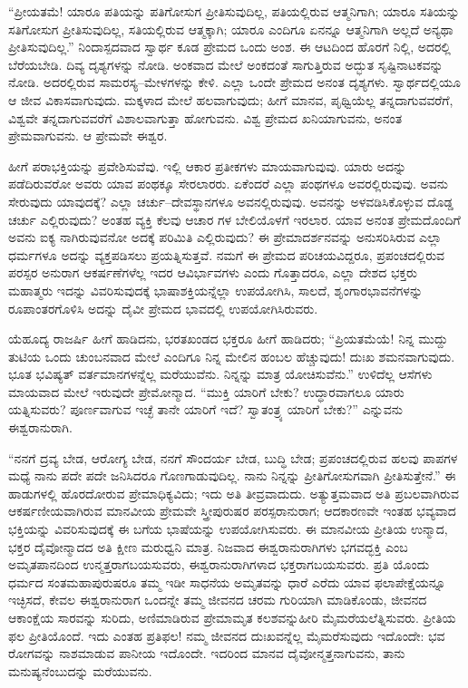 “ಪ್ರೀಯತಮೆ! ಯಾರೂ ಪತಿಯನ್ನು ಪತಿಗೋಸುಗ ಪ್ರೀತಿಸುವುದಿಲ್ಲ, ಪತಿಯಲ್ಲಿರುವ ಆತ್ಮನಿಗಾಗಿ; ಯಾರೂ ಸತಿಯನ್ನು ಸತಿಗೋಸುಗ ಪ್ರೀತಿಸುವುದಿಲ್ಲ, ಸತಿಯಲ್ಲಿರುವ ಆತ್ಮಕ್ಕಾಗಿ; ಯಾರೂ ಎಂದಿಗೂ ಏನನ್ನೂ ಆತ್ಮನಿಗಾಗಿ ಅಲ್ಲದೆ ಅನ್ಯಥಾ ಪ್ರೀತಿಸುವುದಿಲ್ಲ.” ನಿಂದಾಸ್ಪದವಾದ ಸ್ವಾರ್ಥ ಕೂಡ ಪ್ರೇಮದ ಒಂದು ಅಂಶ. ಈ ಆಟದಿಂದ ಹೊರಗೆ ನಿಲ್ಲಿ, ಅದರಲ್ಲಿ ಬೆರೆಯಬೇಡಿ. ದಿವ್ಯ ದೃಶ್ಯಗಳನ್ನು ನೋಡಿ. ಅಂಕವಾದ ಮೇಲೆ ಅಂಕದಂತೆ ಸಾಗುತ್ತಿರುವ ಅದ್ಭುತ ಸೃಷ್ಟಿನಾಟಕವನ್ನು ನೋಡಿ. ಅದರಲ್ಲಿರುವ ಸಾಮರಸ್ಯ–ಮೇಳಗಳನ್ನು ಕೇಳಿ. ಎಲ್ಲಾ ಒಂದೇ ಪ್ರೇಮದ ಅನಂತ ದೃಶ್ಯಗಳು. ಸ್ವಾರ್ಥದಲ್ಲಿಯೂ ಆ ಜೀವ ವಿಕಾಸವಾಗುವುದು. ಮಕ್ಕಳಾದ ಮೇಲೆ ಹಲವಾಗುವುದು; ಹೀಗೆ ಮಾನವ, ಪೃಥ್ವಿಯೆಲ್ಲ ತನ್ನದಾಗುವವರೆಗೆ, ವಿಶ್ವವೇ ತನ್ನದಾಗುವವರೆಗೆ ವಿಶಾಲವಾಗುತ್ತಾ ಹೋಗುವನು. ವಿಶ್ವ ಪ್ರೇಮದ ಖನಿಯಾಗುವನು, ಅನಂತ ಪ್ರೇಮವಾಗುವನು. ಆ ಪ್ರೇಮವೇ ಈಶ್ವರ.

ಹೀಗೆ ಪರಾಭಕ್ತಿಯನ್ನು ಪ್ರವೇಶಿಸುವೆವು. ಇಲ್ಲಿ ಆಕಾರ ಪ್ರತೀಕಗಳು ಮಾಯವಾಗುವುವು. ಯಾರು ಅದನ್ನು ಪಡೆದಿರುವರೋ ಅವರು ಯಾವ ಪಂಥಕ್ಕೂ ಸೇರಲಾರರು. ಏಕೆಂದರೆ ಎಲ್ಲಾ ಪಂಥಗಳೂ ಅವರಲ್ಲಿರುವುವು. ಅವನು ಸೇರುವುದು ಯಾವುದಕ್ಕೆ? ಎಲ್ಲಾ ಚರ್ಚು–ದೇವಸ್ಥಾನಗಳೂ ಅವನಲ್ಲಿರುವುವು. ಅವನನ್ನು ಅಳವಡಿಸಿಕೊಳ್ಳುವ ದೊಡ್ಡ ಚರ್ಚು ಎಲ್ಲಿರುವುದು? ಅಂತಹ ವ್ಯಕ್ತಿ ಕೆಲವು ಆಚಾರ ಗಳ ಬೇಲಿಯೊಳಗೆ ಇರಲಾರ. ಯಾವ ಅನಂತ ಪ್ರೇಮದೊಂದಿಗೆ ಅವನು ಐಕ್ಯ ನಾಗಿರುವುವನೋ ಅದಕ್ಕೆ ಪರಿಮಿತಿ ಎಲ್ಲಿರುವುದು? ಈ ಪ್ರೇಮಾದರ್ಶನವನ್ನು ಅನುಸರಿಸಿರುವ ಎಲ್ಲಾ ಧರ್ಮಗಳೂ ಅದನ್ನು ವ್ಯಕ್ತಪಡಿಸಲು ಪ್ರಯತ್ನಿಸುತ್ತವೆ. ನಮಗೆ ಈ ಪ್ರೇಮದ ಪರಿಚಯವಿದ್ದರೂ, ಪ್ರಪಂಚದಲ್ಲಿರುವ ಪರಸ್ಪರ ಅನುರಾಗ ಆಕರ್ಷಣೆಗಳೆಲ್ಲ ಇದರ ಆವಿರ್ಭಾವಗಳು ಎಂದು ಗೊತ್ತಾದರೂ, ಎಲ್ಲಾ ದೇಶದ ಭಕ್ತರು ಮಹಾತ್ಮರು ಇದನ್ನು ವಿವರಿಸುವುದಕ್ಕೆ ಭಾಷಾಶಕ್ತಿಯನ್ನೆಲ್ಲಾ ಉಪಯೋಗಿಸಿ, ಸಾಲದೆ, ಶೃಂಗಾರಭಾವನೆಗಳನ್ನು ರೂಪಾಂತರಗೊಳಿಸಿ ಅದನ್ನು ದೈವೀ ಪ್ರೇಮದ ಭಾವದಲ್ಲಿ ಉಪಯೋಗಿಸಿರುವರು.

ಯೆಹೂದ್ಯ ರಾಜರ್ಷಿ ಹೀಗೆ ಹಾಡಿದನು, ಭರತಖಂಡದ ಭಕ್ತರೂ ಹೀಗೆ ಹಾಡಿದರು; “ಪ್ರಿಯತಮೆಯೆ! ನಿನ್ನ ಮುದ್ದು ತುಟಿಯ ಒಂದು ಚುಂಬನವಾದ ಮೇಲೆ ಎಂದಿಗೂ ನಿನ್ನ ಮೇಲಿನ ಹಂಬಲ ಹೆಚ್ಚುವುದು! ದುಃಖ ಶಮನವಾಗುವುದು. ಭೂತ ಭವಿಷ್ಯತ್​ ವರ್ತಮಾನಗಳನ್ನೆಲ್ಲ ಮರೆಯುವೆನು. ನಿನ್ನನ್ನು ಮಾತ್ರ ಯೋಚಿಸುವೆನು.” ಉಳಿದೆಲ್ಲ ಆಸೆಗಳು ಮಾಯವಾದ ಮೇಲೆ ಇರುವುದೇ ಪ್ರೇಮೋನ್ಮಾದ. “ಮುಕ್ತಿ ಯಾರಿಗೆ ಬೇಕು? ಉದ್ಧಾರ\-ವಾಗಲೂ ಯಾರು ಯತ್ನಿಸುವರು? ಪೂರ್ಣವಾಗುವ ಇಚ್ಛೆ ತಾನೇ ಯಾರಿಗೆ ಇದೆ? ಸ್ವಾತಂತ್ರ್ಯ ಯಾರಿಗೆ ಬೇಕು?” ಎನ್ನುವನು ಈಶ್ವರಾನುರಾಗಿ.

“ನನಗೆ ದ್ರವ್ಯ ಬೇಡ, ಆರೋಗ್ಯ ಬೇಡ, ನನಗೆ ಸೌಂದರ್ಯ ಬೇಡ, ಬುದ್ಧಿ ಬೇಡ; ಪ್ರಪಂಚದಲ್ಲಿರುವ ಹಲವು ಪಾಪಗಳ ಮಧ್ಯೆ ನಾನು ಪದೇ ಪದೇ ಜನಿಸಿದರೂ ಗೊಣಗಾಡುವುದಿಲ್ಲ. ನಾನು ನಿನ್ನನ್ನು ಪ್ರೀತಿಗೋಸುಗವಾಗಿ ಪ್ರೀತಿಸುತ್ತೇನೆ.” ಈ ಹಾಡುಗಳಲ್ಲಿ ಹೊರದೋರುವ ಪ್ರೇಮಾಧಿಕ್ಯವಿದು; ಇದು ಅತಿ ತೀವ್ರವಾದುದು. ಅತ್ಯುತ್ತಮವಾದ ಅತಿ ಪ್ರಬಲವಾಗಿರುವ ಆಕರ್ಷಣೀಯವಾಗಿರುವ ಮಾನವೀಯ ಪ್ರೇಮವೇ ಸ್ತ್ರೀಪುರುಷರ ಪರಸ್ಪರಾನುರಾಗ; ಆದಕಾರಣವೇ ಇಂತಹ ಭವ್ಯವಾದ ಭಕ್ತಿಯನ್ನು ವಿವರಿಸುವುದಕ್ಕೆ ಈ ಬಗೆಯ ಭಾಷೆಯನ್ನು ಉಪಯೋಗಿಸುವರು. ಈ ಮಾನವೀಯ ಪ್ರೀತಿಯ ಉನ್ಮಾದ, ಭಕ್ತರ ದೈವೋನ್ಮಾದದ ಅತಿ ಕ್ಷೀಣ ಮರುಧ್ವನಿ ಮಾತ್ರ. ನಿಜವಾದ ಈಶ್ವರಾನುರಾಗಿಗಳು ಭಗವದ್ಭಕ್ತಿ ಎಂಬ ಅಮೃತಪಾನದಿಂದ ಉನ್ಮತ್ತರಾಗಬಯಸುವರು, ಈಶ್ವರಾನುರಾಗಿಗಳಾದ ಭಕ್ತರಾಗಬಯಸುವರು. ಪ್ರತಿ ಯೊಂದು ಧರ್ಮದ ಸಂತಮಹಾಪುರುಷರೂ ತಮ್ಮ ಇಡೀ ಸಾಧನೆಯ ಅಮೃತವನ್ನು ಧಾರೆ ಎರೆದು ಯಾವ ಫಲಾಪೇಕ್ಷೆಯನ್ನೂ ಇಚ್ಛಿಸದೆ, ಕೇವಲ ಈಶ್ವರಾನುರಾಗ ಒಂದನ್ನೇ ತಮ್ಮ ಜೀವನದ ಚರಮ ಗುರಿಯಾಗಿ ಮಾಡಿಕೊಂಡು, ಜೀವನದ ಆಕಾಂಕ್ಷೆಯ ಸಾರವನ್ನು ಸುರಿದು, ಅಣಿಮಾಡಿರುವ ಪ್ರೇಮಾಮೃತ ಕಲಶವನ್ನುಹೀರಿ ಮೈಮರೆಯಲೆತ್ನಿಸುವರು. ಪ್ರೀತಿಯ ಫಲ ಪ್ರೀತಿಯೊಂದೆ. ಇದು ಎಂತಹ ಪ್ರತಿಫಲ! ನಮ್ಮ ಜೀವನದ ದುಃಖವನ್ನೆಲ್ಲ ಮೈಮರೆಸುವುದು ಇದೊಂದೇ: ಭವ ರೋಗವನ್ನು ನಾಶಮಾಡುವ ಪಾನೀಯ ಇದೊಂದೇ. ಇದರಿಂದ ಮಾನವ ದೈವೋನ್ಮತ್ತನಾಗುವನು, ತಾನು ಮನುಷ್ಯನೆಂಬುದನ್ನು ಮರೆಯುವನು.

